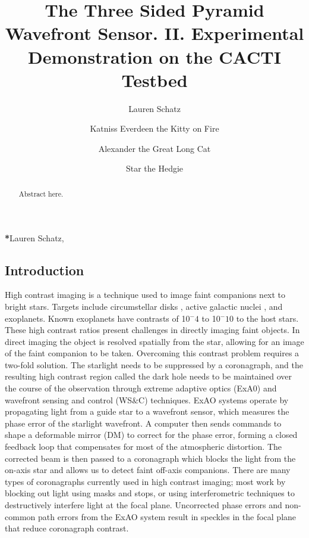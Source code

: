 \documentclass[12pt]{spieman}  %
\title{The Three Sided Pyramid Wavefront Sensor. II.  Experimental Demonstration on the CACTI Testbed}
\author[a,*]{Lauren Schatz}
\author[b]{Katniss Everdeen the Kitty on Fire}
\author[c]{Alexander the Great Long Cat}
\author[d]{Star the Hedgie}
\affil[a]{University Name, Faculty Group, Department, Street Address, City, Country, Postal Code}
\affil[b]{Cozy pile of blankets}
\affil[c]{The very top of the cat tree}
\affil[d]{Deep inside the snuggle sack}
\newcommand{\jrmadd}[1]{\textcolor{red}{#1}}
\begin{document}
 
\maketitle

\begin{abstract}
Abstract here. 
\end{abstract}


{\noindent \footnotesize\textbf{*}Lauren Schatz,   }

\begin{spacing}{2}   %

\section{Introduction}
\label{sect:intro}  %



High contrast imaging is a technique used to image faint companions next to bright stars. Targets include circumstellar disks \cite{rodigas2014morphology}, active galactic nuclei \cite{imanishi2020subaru}, and exoplanets\cite{bowler2016imaging}. Known exoplanets have contrasts of 10$^-4$ to 10$^-10$ to the host stars. These high contrast ratios present challenges in directly imaging faint objects. In direct imaging the object is resolved spatially from the star, allowing for an image of the faint companion to be taken. Overcoming this contrast problem requires a two-fold solution. The starlight needs to be suppressed by a coronagraph, and the resulting high contrast region called the dark hole needs to be maintained over the course of the observation through extreme adaptive optics (ExA0) and wavefront sensing and control (WS$\&$C) techniques. ExAO systems operate by propagating light from a guide star to a wavefront sensor, which measures the phase error of the starlight wavefront. A computer then sends commands to shape a deformable mirror (DM) to correct for the phase error, forming a closed feedback loop that compensates for most of the atmospheric distortion. The corrected beam is then passed to a coronagraph which blocks the light from the on-axis star and allows us to detect faint off-axis companions. There are many types of coronagraphs currently used in high contrast imaging; most work by blocking out light using masks and stops\cite{soummer2004apodized}, or using interferometric techniques to destructively interfere light at the focal plane.\cite{foo2005optical} Uncorrected phase errors and  non-common path errors from the ExAO system result in speckles in the focal plane that reduce coronagraph contrast.


\end{spacing}
\end{document}
